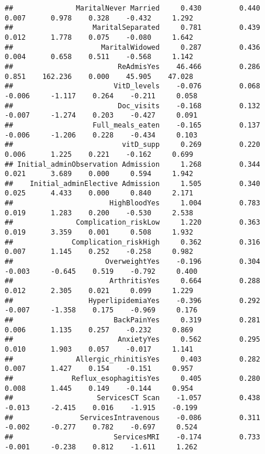 \documentclass[
]{article}
\begin{document}
\begin{verbatim}
##               MaritalNever Married     0.430         0.440        0.007      0.978    0.328    -0.432     1.292 
##                   MaritalSeparated     0.781         0.439        0.012      1.778    0.075    -0.080     1.642 
##                     MaritalWidowed     0.287         0.436        0.004      0.658    0.511    -0.568     1.142 
##                         ReAdmisYes    46.466         0.286        0.851    162.236    0.000    45.905    47.028 
##                        VitD_levels    -0.076         0.068       -0.006     -1.117    0.264    -0.211     0.058 
##                         Doc_visits    -0.168         0.132       -0.007     -1.274    0.203    -0.427     0.091 
##                   Full_meals_eaten    -0.165         0.137       -0.006     -1.206    0.228    -0.434     0.103 
##                          vitD_supp     0.269         0.220        0.006      1.225    0.221    -0.162     0.699 
## Initial_adminObservation Admission     1.268         0.344        0.021      3.689    0.000     0.594     1.942 
##    Initial_adminElective Admission     1.505         0.340        0.025      4.433    0.000     0.840     2.171 
##                       HighBloodYes     1.004         0.783        0.019      1.283    0.200    -0.530     2.538 
##               Complication_riskLow     1.220         0.363        0.019      3.359    0.001     0.508     1.932 
##              Complication_riskHigh     0.362         0.316        0.007      1.145    0.252    -0.258     0.982 
##                      OverweightYes    -0.196         0.304       -0.003     -0.645    0.519    -0.792     0.400 
##                       ArthritisYes     0.664         0.288        0.012      2.305    0.021     0.099     1.229 
##                  HyperlipidemiaYes    -0.396         0.292       -0.007     -1.358    0.175    -0.969     0.176 
##                        BackPainYes     0.319         0.281        0.006      1.135    0.257    -0.232     0.869 
##                         AnxietyYes     0.562         0.295        0.010      1.903    0.057    -0.017     1.141 
##               Allergic_rhinitisYes     0.403         0.282        0.007      1.427    0.154    -0.151     0.957 
##              Reflux_esophagitisYes     0.405         0.280        0.008      1.445    0.149    -0.144     0.954 
##                    ServicesCT Scan    -1.057         0.438       -0.013     -2.415    0.016    -1.915    -0.199 
##                ServicesIntravenous    -0.086         0.311       -0.002     -0.277    0.782    -0.697     0.524 
##                        ServicesMRI    -0.174         0.733       -0.001     -0.238    0.812    -1.611     1.262 

\end{verbatim}
\end{document}
